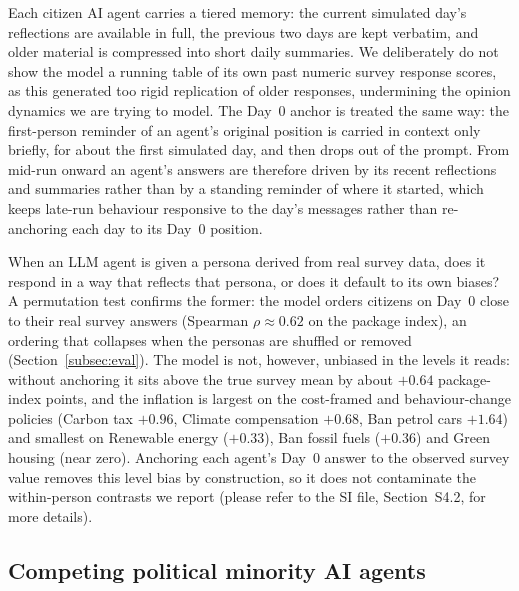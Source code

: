 \documentclass[pdflatex,sn-mathphys-num]{sn-jnl}%
\theoremstyle{thmstyleone}%
\theoremstyle{thmstyletwo}%
\theoremstyle{thmstylethree}%
\begin{document}
Each citizen AI agent carries a tiered memory: the current simulated day's reflections
are available in full, the previous two days are kept verbatim, and older material is
compressed into short daily summaries. We deliberately do not show the model a running
table of its own past numeric survey response scores, as this generated too rigid
replication of older responses, undermining the opinion dynamics we are trying to model.
The Day~0 anchor is treated the same way: the first-person reminder of an agent's
original position is carried in context only briefly, for about the first simulated day,
and then drops out of the prompt. From mid-run onward an agent's answers are therefore
driven by its recent reflections and summaries rather than by a standing reminder of
where it started, which keeps late-run behaviour responsive to the day's messages rather
than re-anchoring each day to its Day~0 position.


When an LLM agent is given a persona derived from real survey data, does it respond in a
way that reflects that persona, or does it default to its own biases? A permutation test
confirms the former: the model orders citizens on Day~0 close to their real survey
answers (Spearman $\rho \approx 0.62$ on the package index), an ordering that collapses
when the personas are shuffled or removed (Section~\ref{subsec:eval}). The model is not,
however, unbiased in the levels it reads: without anchoring it sits above the true survey
mean by about $+0.64$ package-index points, and the inflation is largest on the
cost-framed and behaviour-change policies (Carbon tax $+0.96$, Climate compensation
$+0.68$, Ban petrol cars $+1.64$) and smallest on Renewable energy ($+0.33$), Ban fossil
fuels ($+0.36$) and Green housing (near zero). Anchoring each agent's Day~0 answer to the
observed survey value removes this level bias by construction, so it does not contaminate
the within-person contrasts we report (please refer to the SI file, Section~S4.2, for
more details).

\subsection{Competing political minority AI agents}\label{subsec:political}
\end{document}
